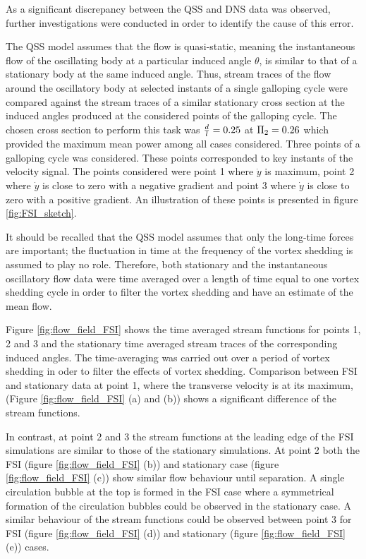 As a significant discrepancy between the QSS and DNS data was observed, further investigations were conducted in order to identify the cause of this error. 

The QSS model assumes that the flow is quasi-static, meaning the instantaneous flow of the oscillating body at a particular induced angle $\theta$, is similar to that of a stationary body at the same induced angle. Thus, stream traces of the flow around the oscillatory body at selected instants of a single galloping cycle were compared against the stream traces of a similar stationary cross section at the induced angles produced at the considered points of the galloping cycle. The chosen cross section to perform this task was $\frac{d}{l}=0.25$ at $\Pi_2=0.26$ which provided the maximum mean power among all cases considered. Three points of a galloping cycle was considered. These points corresponded to key instants of the velocity signal. The points considered  were point 1 where $\dot{y}$ is maximum, point 2 where $\dot{y}$ is close to zero with a negative gradient and point 3 where $\dot{y}$ is close to zero with a positive gradient. An illustration of these points is presented in figure \ref{fig:FSI_sketch}.

It should be recalled that the QSS model assumes that only the long-time forces are important; the fluctuation in time at the frequency of the vortex shedding is assumed to play no role. Therefore, both stationary and the instantaneous oscillatory flow data were time averaged over a length of time equal to one vortex shedding cycle in order to filter the vortex shedding and have an estimate of the mean flow.   




Figure \ref{fig:flow_field_FSI} shows the time averaged stream functions for points 1, 2 and 3 and the stationary time averaged stream traces of the corresponding induced angles. The time-averaging was carried out over a period of vortex shedding in oder to filter the effects of vortex shedding. Comparison between FSI and stationary data at point 1, where the transverse velocity is at its maximum, (Figure \ref{fig:flow_field_FSI} (a) and (b)) shows a significant difference of the stream functions. 



In contrast, at point 2 and 3 the stream functions at the leading edge of the FSI simulations are similar to those of the stationary simulations. At point 2 both the FSI (figure \ref{fig:flow_field_FSI} (b)) and stationary  case (figure \ref{fig:flow_field_FSI} (c)) show similar flow behaviour until separation. A single circulation bubble at the top is formed in the FSI case where a symmetrical formation of the circulation bubbles could be observed in the stationary case. A similar behaviour of the stream functions could be observed between point 3 for FSI (figure \ref{fig:flow_field_FSI} (d)) and stationary (figure \ref{fig:flow_field_FSI} (e)) cases. 

